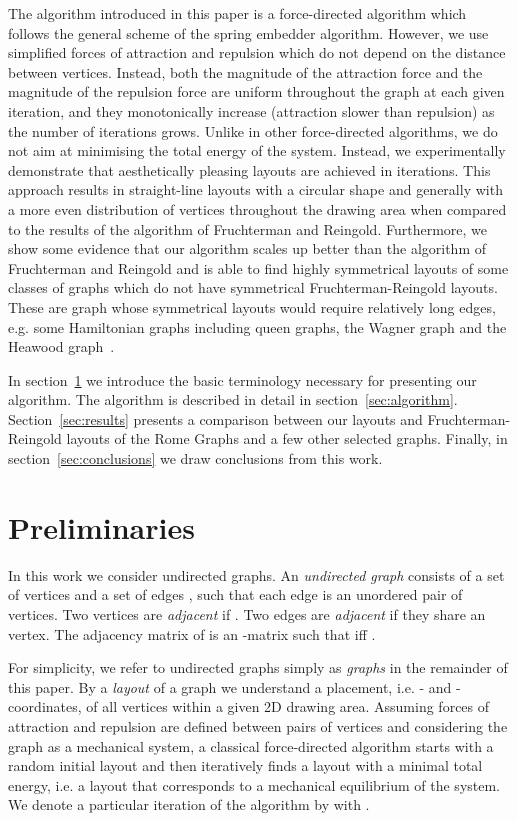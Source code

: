 \documentclass{llncs}
\begin{document}
The algorithm introduced in this paper is a force-directed algorithm which follows the general scheme of the spring embedder algorithm. However, we use simplified forces of attraction and repulsion which do not depend on the distance between vertices. Instead, both the magnitude of the attraction force and the magnitude of the repulsion force are uniform throughout the graph at each given iteration, and they monotonically increase (attraction slower than repulsion) as the number of iterations grows. Unlike in other force-directed algorithms, we do not aim at minimising the total energy of the system. Instead, we experimentally demonstrate that aesthetically pleasing layouts are achieved in  iterations. This approach results in straight-line layouts with a circular shape and generally with a more even distribution of vertices throughout the drawing area when compared to the results of the algorithm of Fruchterman and Reingold. Furthermore, we show some evidence that our algorithm scales up better than the algorithm of Fruchterman and Reingold and is able to find highly symmetrical layouts of some classes of graphs which do not have symmetrical Fruchterman-Reingold layouts. These are graph whose symmetrical layouts would require relatively long edges, e.g. some Hamiltonian graphs including queen graphs, the Wagner graph and the Heawood graph~\cite{Weisstein2015}.

In section~\ref{sec:preliminaries} we introduce the basic terminology necessary for presenting our algorithm. The algorithm is described in detail in section~\ref{sec:algorithm}. Section~\ref{sec:results} presents a comparison between our layouts and Fruchterman-Reingold layouts of the Rome Graphs and a few other selected graphs. Finally, in section~\ref{sec:conclusions} we draw conclusions from this work.

\section{Preliminaries}\label{sec:preliminaries}

In this work we consider undirected graphs. An \emph{undirected graph}  consists of a set of  vertices  and a set of  edges , such that each edge is an unordered pair of vertices. Two vertices  are \emph{adjacent} if . Two edges are \emph{adjacent} if they share an vertex. The adjacency matrix  of  is an  -matrix such that  iff .

For simplicity, we refer to undirected graphs simply as \emph{graphs} in the remainder of this paper. By a \emph{layout} of a graph we understand a placement, i.e. - and -coordinates, of all vertices within a given 2D drawing area. Assuming forces of attraction and repulsion are defined between pairs of vertices and considering the graph as a mechanical system, a classical force-directed algorithm starts with a random initial layout and then iteratively finds a layout with a minimal total energy, i.e. a layout that corresponds to a mechanical equilibrium of the system. We denote a particular iteration of the algorithm by  with .
\end{document}
